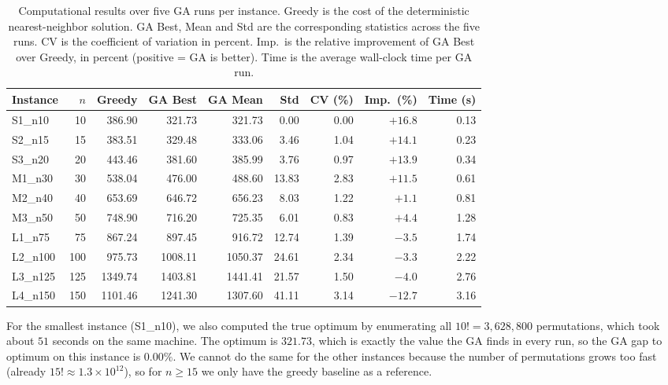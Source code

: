 \documentclass [a4paper, 11pt, titlepage] {article}
\begin{document}
\begin{table}[H]
\centering
\small
\begin{tabular}{|l|r|r|r|r|r|r|r|r|}
\hline
\textbf{Instance} & \textbf{$n$} & \textbf{Greedy} & \textbf{GA Best} & \textbf{GA Mean} & \textbf{Std} & \textbf{CV (\%)} & \textbf{Imp.\ (\%)} & \textbf{Time (s)} \\
\hline
S1\_n10  &  10 &  386.90 &  321.73 &  321.73 &  0.00 & 0.00 &  $+16.8$ & 0.13 \\
S2\_n15  &  15 &  383.51 &  329.48 &  333.06 &  3.46 & 1.04 &  $+14.1$ & 0.23 \\
S3\_n20  &  20 &  443.46 &  381.60 &  385.99 &  3.76 & 0.97 &  $+13.9$ & 0.34 \\
M1\_n30  &  30 &  538.04 &  476.00 &  488.60 & 13.83 & 2.83 &  $+11.5$ & 0.61 \\
M2\_n40  &  40 &  653.69 &  646.72 &  656.23 &  8.03 & 1.22 &   $+1.1$ & 0.81 \\
M3\_n50  &  50 &  748.90 &  716.20 &  725.35 &  6.01 & 0.83 &   $+4.4$ & 1.28 \\
L1\_n75  &  75 &  867.24 &  897.45 &  916.72 & 12.74 & 1.39 &   $-3.5$ & 1.74 \\
L2\_n100 & 100 &  975.73 & 1008.11 & 1050.37 & 24.61 & 2.34 &   $-3.3$ & 2.22 \\
L3\_n125 & 125 & 1349.74 & 1403.81 & 1441.41 & 21.57 & 1.50 &   $-4.0$ & 2.76 \\
L4\_n150 & 150 & 1101.46 & 1241.30 & 1307.60 & 41.11 & 3.14 &  $-12.7$ & 3.16 \\
\hline
\end{tabular}
\caption{Computational results over five GA runs per instance. Greedy is the cost of the deterministic nearest-neighbor solution. GA Best, Mean and Std are the corresponding statistics across the five runs. CV is the coefficient of variation in percent. Imp.\ is the relative improvement of GA Best over Greedy, in percent (positive = GA is better). Time is the average wall-clock time per GA run.}
\label{tab:results}
\end{table}

For the smallest instance (S1\_n10), we also computed the true optimum by enumerating all $10! = 3{,}628{,}800$ permutations, which took about $51$ seconds on the same machine. The optimum is $321.73$, which is exactly the value the GA finds in every run, so the GA gap to optimum on this instance is $0.00\%$. We cannot do the same for the other instances because the number of permutations grows too fast (already $15! \approx 1.3 \times 10^{12}$), so for $n \geq 15$ we only have the greedy baseline as a reference.
\end{document}
